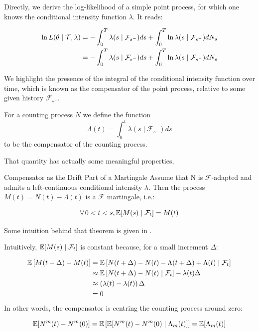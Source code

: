 \documentclass[11pt]{book}
\begin{document}
Directly, we derive the log-likelihood of a simple point process, for which one knows the conditional intensity function $\lambda$. It reads:

\begin{align}
\ln L( \theta \mid \mathcal{T}, \lambda ) &= - \int_0^T  \lambda(s \mid \mathcal F_{s^-}) ds + \int_0^T  \ln \lambda(s \mid \mathcal F_{s^-} )d N_s \notag \\
&=  - \int_0^T \lambda(s \mid \mathcal F_{s^-}) ds + \int_0^T  \ln \lambda(s \mid \mathcal F_{s^-} )d N_s 
\label{eq:intensity_lambda}
\end{align}

We highlight the presence of the integral of the conditional intensity function over time, which is known as the compensator of the point process, relative to some given history $\mathcal F_{s^-}$. 


\begin{definition}[Compensator]
\label{def:compensator}
For a counting process $N$ we define the function $$\Lambda(t) = \int_0^t \lambda (s \mid \mathcal F_{s^-} ) ds $$  to be the compensator of the counting process.
\end{definition}

That quantity has actually some meaningful properties,

\begin{theoreme}{Compensator as the Drift Part of a Martingale}
Assume that N is $\mathcal F$-adapted and admits a left-continuous conditional intensity $\lambda$. Then the process $M(t) = N(t) - \Lambda (t)$ is a $\mathcal F$ martingale, i.e.:

$$\forall 0 < t < s, \E [ M(s) \mid \mathcal F_t ] = M(t)$$
\end{theoreme}


\begin{demo}{}{}
Some intuition behind that theorem is given in \cite{daley}.

Intuitively, $\mathbb E[M(s) \mid \mathcal F_t]$ is constant because, for a small increment $\Delta$:

\begin{align*}
\mathbb E \left [ M( t + \Delta ) - M(t) \right ] &= \mathbb E \left[ N(t+ \Delta ) - N(t) - \Lambda( t + \Delta) + \Lambda(t) \mid \mathcal F_t \right ] \\
&\approx   \mathbb E \left[ N(t+ \Delta ) - N(t) \mid \mathcal F_t \right ] - \lambda(t) \Delta  \\
&\approx \left ( \lambda(t) - \lambda(t) \right  ) \Delta  \\
&= 0 
\end{align*}
In other words, the compensator is centring the counting process around zero: 

$$\mathbb E [ N^m (t) - N^m (0) ] = \mathbb E  \left  [ \mathbb E [ N^m (t) - N^m (0) \mid \Lambda_m(t) ]  \right ] = \mathbb E [ \Lambda_m (t) ] $$

\end{demo}
\end{document}
